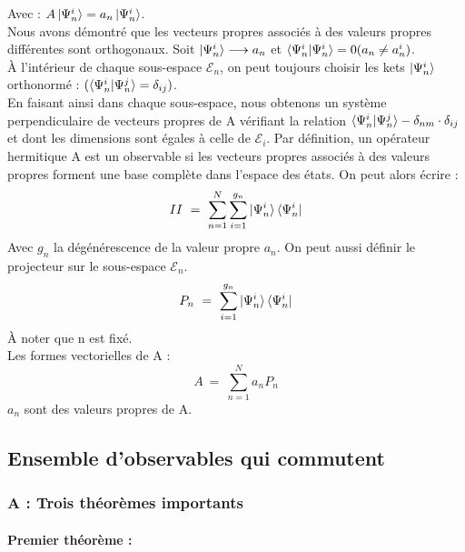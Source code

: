 \documentclass[12pt,a4paper,titlepage]{book}
\begin{document}
Avec : $A \ket{\Psi_n^i} = a_n \ket{\Psi_n^i}$.\\

Nous avons démontré que les vecteurs propres associés à des valeurs propres différentes sont orthogonaux. Soit $\ket{\Psi_n^i} \longrightarrow a_n$ et $\braket{\Psi_n^i | \Psi_n^i} = 0 (a_n \neq a_n^i)$.\\

À l'intérieur de chaque sous-espace $\mathcal{E}_n$, on peut toujours choisir les kets $\ket{\Psi_n^i}$ orthonormé : $(\braket{\Psi_n^i | \Psi_n^j} = \delta_{ij})$.\\

En faisant ainsi dans chaque sous-espace, nous obtenons un système perpendiculaire de vecteurs propres de A vérifiant la relation $\braket{\Psi_n^i | \Psi_n^j} - \delta_{nm} \cdot \delta_{ij} $ et dont les dimensions sont égales à celle de $\mathcal{E}_i$. Par définition, un opérateur hermitique A est un observable si les vecteurs propres associés à des valeurs propres forment une base complète dans l'espace des états. On peut alors écrire :\\

\begin{equation*}
II ~=~ \sum\limits_{n=1}^N \sum\limits_{i=1}^{g_n} \ket{\Psi_n^i} \bra{\Psi_n^i}
\end{equation*}
Avec $g_n$ la dégénérescence de la valeur propre $a_n$. On peut aussi définir le projecteur sur le sous-espace $\mathcal{E}_n$.
\begin{equation*}
P_n ~=~ \sum\limits_{i=1}^{g_n} \ket{\Psi_n^i} \bra{\Psi_n^i}
\end{equation*}
À noter que n est fixé.\\

Les formes vectorielles de A :
\begin{equation*}
A ~=~ \sum\limits_{n=1}^{N} a_n P_n
\end{equation*}
$a_n$ sont des valeurs propres de A.\\

\subsection{Ensemble d'observables qui commutent}
\subsubsection{A : Trois théorèmes importants}

\paragraph*{Premier théorème :}
\end{document}
